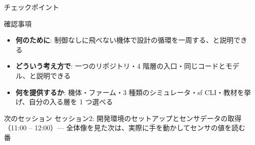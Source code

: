 \begin{frame}{チェックポイント}
  \begin{alertblock}{確認事項}
    \begin{itemize}\small
      \item[$\square$] \textbf{何のために}: 制御なしに飛べない機体で設計の循環を一周する、と説明できる
      \item[$\square$] \textbf{どういう考え方で}: 一つのリポジトリ・4 階層の入口・同じコードとモデル、と説明できる
      \item[$\square$] \textbf{何を提供するか}: 機体・ファーム・3 種類のシミュレータ・sf CLI・教材を挙げ、自分の入る層を 1 つ選べる
    \end{itemize}
  \end{alertblock}

  \vspace{0.5em}

  \begin{block}{次のセッション}
    セッション2: 開発環境のセットアップとセンサデータの取得（11:00 -- 12:00）--- 全体像を見た次は、実際に手を動かしてセンサの値を読む番
  \end{block}
\end{frame}

